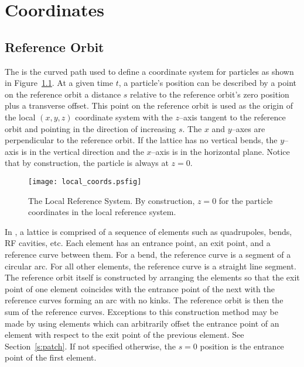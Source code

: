 \chapter{Coordinates}

\section{Reference Orbit}
\label{s:ref}

The  is the curved path used to define a coordinate
system for particles as shown in Figure~\ref{f:local_coords}.  At a
given time $t$, a particle's position can be described by a point on
the reference orbit a distance $s$ relative to the reference orbit's
zero position plus a transverse offset. This point on the reference
orbit is used as the origin of the local $(x, y, z)$ coordinate system
with the $z$--axis tangent to the reference orbit and pointing in the
direction of increasing $s$. The $x$ and $y$--axes are
perpendicular to the reference orbit. If the lattice has no vertical
bends, the $y$--axis is in the vertical direction and the $x$--axis is
in the horizontal plane. Notice that by construction, the particle is
always at $z = 0$.

\begin{figure}[tb]
\centering
\texttt{[image: local\_coords.psfig]}
\caption[The Local Reference System.]
{The Local Reference System. By construction, $z = 0$ for
the particle coordinates in the local reference system.}
\label{f:local_coords}
\end{figure}

In \bmad, a lattice is comprised of a sequence of elements such as
quadrupoles, bends, RF cavities, etc. Each element has an entrance
point, an exit point, and a reference curve between them. For a bend,
the reference curve is a segment of a circular arc. For all other
elements, the reference curve is a straight line segment. The
reference orbit itself is constructed by arranging the elements so
that the exit point of one element coincides with the entrance point
of the next with the reference curves forming an arc with no kinks.
The reference orbit is then the sum of the reference
curves. Exceptions to this construction method may be made by using
 elements which can arbitrarily offset the entrance point
of an element with respect to the exit point of the previous element.
See Section~\ref{s:patch}.  If not specified otherwise, the $s = 0$
position is the entrance point of the first element.

